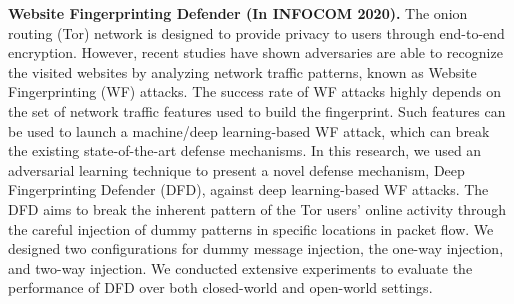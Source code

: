\documentclass{NSF}
\newcommand{\BfPara}[1]{{\noindent\textbf{#1.}}\xspace}
\begin{document}
\BfPara{Website Fingerprinting Defender (In INFOCOM 2020)} The onion routing (Tor) network is designed to provide privacy to users through end-to-end encryption. However, recent studies have shown adversaries are able to recognize the visited websites by analyzing network traffic patterns, known as Website Fingerprinting (WF) attacks. The success rate of WF attacks highly depends on the set of network traffic features used to build the fingerprint. Such features can be used to launch a machine/deep learning-based WF attack, which can break the existing state-of-the-art defense mechanisms. In this research, we used an adversarial learning technique to present a novel defense mechanism, Deep Fingerprinting Defender (DFD), against deep learning-based WF attacks. The DFD aims to break the inherent pattern of the Tor users' online activity through the careful injection of dummy patterns in specific locations in packet flow. We designed two configurations for dummy message injection, the one-way injection, and two-way injection. We conducted extensive experiments to evaluate the performance of DFD over both closed-world and open-world settings. %


\end{document}
